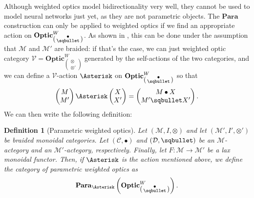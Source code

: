 \documentclass[12pt,a4paper,openright,twoside]{report}
\theoremstyle{plain}
\newtheorem{definition}[proposition]{Definition}
\theoremstyle{definition}
\begin{document}
Although weighted optics model bidirectionality very well, they cannot be used to model neural networks just yet, as they are not parametric objects. The $\mathbf{Para}$ construction can only be applied to weighted optics if we find an appropriate action on $\mathbf{Optic}^W_{\left(\begin{smallmatrix}\bullet\\\sqbullet\end{smallmatrix}\right)}$. As shown in \cite{gavranovic2024fundamental}, this can be done under the assumption that $\mathcal{M}$ and $\mathcal{M}'$ are braided: if that's the case, we can just weighted optic category $ \mathcal{V} = \mathbf{Optic}^W_{\left(\begin{smallmatrix}\otimes\\\otimes'\end{smallmatrix}\right)}$ generated by the self-actions of the two categories, and we can define a $\mathcal{V}$-action $\Asterisk$ on $\mathbf{Optic}^W_{\left(\begin{smallmatrix}\bullet\\\sqbullet\end{smallmatrix}\right)}$ so that 
\[\left(\begin{matrix}M\\M'\end{matrix}\right) \Asterisk \left(\begin{matrix}X\\X'\end{matrix}\right) = \left(\begin{matrix}M \bullet X\\ M' \sqbullet X'\end{matrix}\right).\]
We can then write the following definition:

\begin{definition}[Parametric weighted optics]
  Let $(\mathcal{M}, I, \otimes)$ and let $(\mathcal{M}', I', \otimes')$ be braided monoidal categories. Let $(\mathcal{C}, \bullet)$ and $(\mathcal{D}, \sqbullet)$ be an $\mathcal{M}$-actegory and an $\mathcal{M}'$-actegory, respectively. Finally, let $F: \mathcal{M} \to \mathcal{M}'$ be a lax monoidal functor. Then, if $\Asterisk$ is the action mentioned above, we define the category of parametric weighted optics as 
  \[\mathbf{Para}_{\Asterisk}\left(\mathbf{Optic}^W_{\left(\begin{smallmatrix}\bullet\\\sqbullet\end{smallmatrix}\right)}\right).\]
\end{definition}
\end{document}
